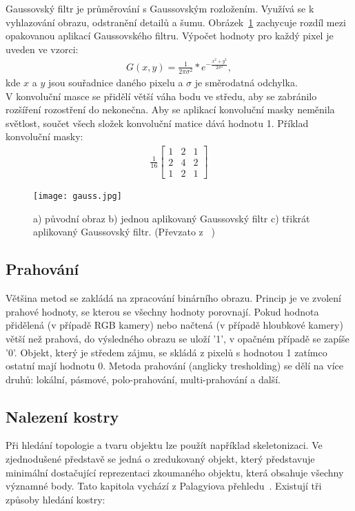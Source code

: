 \newpage
Gaussovský filtr je průměrování s Gaussovským rozložením. Využívá se k vyhlazování obrazu, odstranění detailů a šumu. Obrázek~\ref{pic2} zachycuje rozdíl mezi opakovanou aplikací Gaussovského filtru. Výpočet hodnoty pro každý pixel je uveden ve vzorci:
\begin{eqnarray}
G(x,y) = \frac{1}{2 \pi \sigma^{2}}*e^{-\frac{x^{2}+y^{2}}{2\sigma^{2}}}  ,
\label{gauss}
\end{eqnarray}
kde $ x $ a $ y $ jsou souřadnice daného pixelu a $ \sigma $ je směrodatná odchylka.\\

V konvoluční masce se přidělí větší váha bodu ve středu, aby se zabránilo rozšíření rozostření do nekonečna. Aby se aplikací konvoluční masky neměnila světlost, součet všech složek konvoluční matice dává hodnotu 1. Příklad konvoluční masky:
\begin{eqnarray}
\frac{1}{16} \begin{bmatrix}
1 & 2 & 1 \\
2 & 4 & 2 \\
1 & 2 & 1
\end{bmatrix}
\end{eqnarray} 

\begin{figure}[h]
\centering
\texttt{[image: gauss.jpg]}
\caption{a) původní obraz b) jednou aplikovaný Gaussovský filtr c) třikrát aplikovaný Gaussovský filtr. (Převzato z ~\cite{15}) }
\label{pic2}
\end{figure}

\subsection{Prahování}
Většina metod se zakládá na zpracování binárního obrazu. Princip je ve zvolení prahové hodnoty, se kterou se všechny hodnoty porovnají. Pokud hodnota přidělená (v případě RGB kamery) nebo načtená (v případě hloubkové kamery) větší než prahová, do výsledného obrazu se uloží '1', v opačném případě se zapíše '0'. Objekt, který je středem zájmu, se skládá z pixelů s hodnotou 1 zatímco ostatní mají hodnotu 0. Metoda prahování (anglicky tresholding) se dělí na více druhů: lokální, pásmové, polo-prahování, multi-prahování a další.~\cite{hlav}

\subsection{Nalezení kostry}
Při hledání topologie a tvaru objektu lze použít například skeletonizaci. Ve zjednodušené představě se jedná o zredukovaný objekt, který představuje minimální dostačující reprezentaci zkoumaného objektu, která obsahuje všechny významné body. Tato kapitola vychází z Palagyiova přehledu~\cite{25}. Existují tři způsoby hledání kostry:

